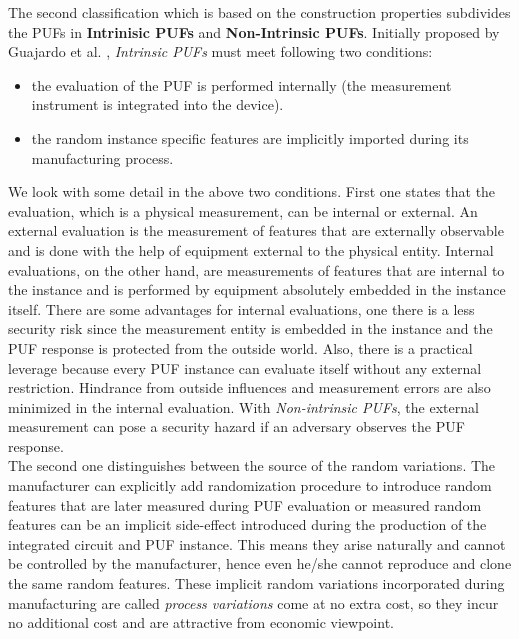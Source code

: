 The second classification which is based on the construction properties subdivides the PUFs in \textbf{Intrinisic PUFs} and \textbf{Non-Intrinsic PUFs}. Initially proposed by Guajardo et al. \cite{11}, \emph{Intrinsic PUFs} must meet following two conditions:
\begin{itemize}
	\item the evaluation of the PUF is performed internally (the measurement instrument is integrated into the device).
	\item the random instance specific features are implicitly imported during its manufacturing process.
\end{itemize}

We look with some detail in the above two conditions. First one states that the evaluation, which is a physical measurement, can be internal or external. An external evaluation is the measurement of features that are externally observable and is done with the help of equipment external to the physical entity. Internal evaluations, on the other hand, are measurements of features that are internal to the instance and is performed by equipment absolutely embedded in the instance itself. There are some
advantages for internal evaluations, one there is a less security risk since the measurement entity is embedded in the instance and the PUF response is protected from the outside world. Also, there is a practical leverage because every PUF instance can evaluate itself without any external restriction. Hindrance from outside influences and measurement errors are also minimized in the internal evaluation. With \emph{Non-intrinsic PUFs}, the external measurement can pose a security
hazard if an adversary observes the PUF response.\\

The second one distinguishes between the source of the random variations. The manufacturer can explicitly add randomization procedure to introduce random features that are later measured during PUF evaluation or measured random features can be an implicit side-effect introduced during the production of the integrated circuit and PUF instance. This means they arise naturally and cannot be controlled by the manufacturer, hence even he/she cannot reproduce and clone the same random features. These
implicit random variations incorporated during manufacturing are called \emph{process variations} come at no extra cost, so they incur no additional cost and are attractive from economic viewpoint.\\

